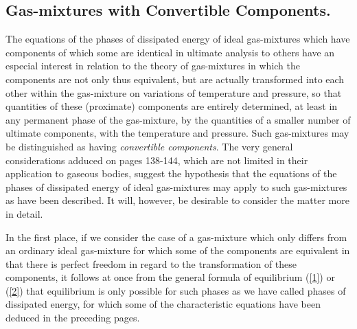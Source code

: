 \documentclass[12pt]{article}
\begin{document}

\subsection{Gas-mixtures with Convertible Components.}
The equations of the phases of dissipated energy of ideal gas-mixtures which have components of which some are identical in ultimate analysis to others have an especial interest in relation to the theory of gas-mixtures in which the components are not only thus equivalent, but are actually transformed into each other within the gas-mixture on variations of temperature and pressure, so that quantities of these (proximate) components are entirely determined, at least in any permanent phase of the gas-mixture, by the quantities of a smaller number of ultimate components, with the temperature and pressure. Such gas-mixtures may be distinguished as having \textit{convertible components}. The very general considerations adduced on pages 138-144, which are not limited in their application to gaseous bodies, suggest the hypothesis that the equations of the phases of dissipated energy of ideal gas-mixtures may apply to such gas-mixtures as have been described. It will, however, be desirable to consider the matter more in detail.


In the first place, if we consider the case of a gas-mixture which only differs from an ordinary ideal gas-mixture for which some of the components are equivalent in that there is perfect freedom in regard to the transformation of these components, it follows at once from the general formula of equilibrium (\ref{1}) or (\ref{2}) that equilibrium is only possible for such phases as we have called phases of dissipated energy, for which some of the characteristic equations have been deduced in the preceding pages.
\end{document}
